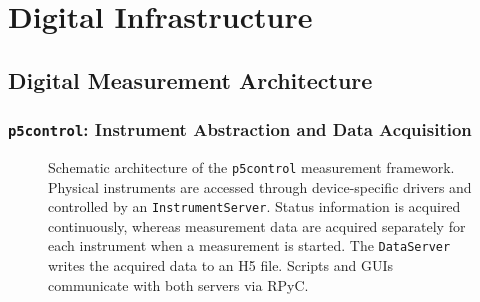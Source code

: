 
\section{Digital Infrastructure}
\label{sec:methods:digital}

    \newpage
    \subsection{Digital Measurement Architecture}
    \label{subsec:methods:digital:architecture}

        \newpage
        \subsubsection*{\texttt{p5control}: Instrument Abstraction and Data Acquisition}

        \begin{figure}
            \centering
            \caption{Schematic architecture of the \texttt{p5control} measurement framework. Physical instruments are accessed through device-specific drivers and controlled by an \texttt{InstrumentServer}. Status information is acquired continuously, whereas measurement data are acquired separately for each instrument when a measurement is started. The \texttt{DataServer} writes the acquired data to an H5 file. Scripts and GUIs communicate with both servers via RPyC.}
            \label{fig:methods:digital:p5control}
        \end{figure}


